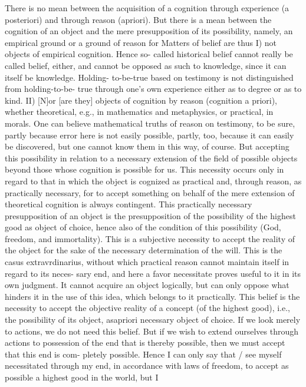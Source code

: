 There is no mean between the acquisition of a cognition through experience (a posteriori)
and through reason (apriori). But there is a mean between the cognition of an object and the
mere presupposition of its possibility, namely, an empirical ground or a ground of reason for
Matters of belief are thus I) not objects of empirical cognition. Hence so-
called historical belief cannot really be called belief, either, and cannot be
opposed as such to knowledge, since it can itself be knowledge. Holding-
to-be-true based on testimony is not distinguished from holding-to-be-
true through one's own experience either as to degree or as to kind.
II) [N]or [are they] objects of cognition by reason (cognition a priori),
whether theoretical, e.g., in mathematics and metaphysics, or practical, in
morals.
One can believe mathematical truths of reason on testimony, to be sure,
partly because error here is not easily possible, partly, too, because it can
easily be discovered, but one cannot know them in this way, of course. But
accepting this possibility in relation to a necessary extension of the field of possible objects
beyond those whose cognition is possible for us. This necessity occurs only in regard to that
in which the object is cognized as practical and, through reason, as practically necessary, for
to accept something on behalf of the mere extension of theoretical cognition is always
contingent. This practically necessary presupposition of an object is the presupposition of the
possibility of the highest good as object of choice, hence also of the condition of this
possibility (God, freedom, and immortality). This is a subjective necessity to accept the
reality of the object for the sake of the necessary determination of the will. This is the casus
extravrdinarius, without which practical reason cannot maintain itself in regard to its neces-
sary end, and here a favor necessitate proves useful to it in its own judgment. It cannot acquire
an object logically, but can only oppose what hinders it in the use of this idea, which belongs
to it practically.
This belief is the necessity to accept the objective reality of a concept (of the highest
good), i.e., the possibility of its object, asapriori necessary object of choice. If we look merely
to actions, we do not need this belief. But if we wish to extend ourselves through actions to
possession of the end that is thereby possible, then we must accept that this end is com-
pletely possible. Hence I can only say that / see myself necessitated through my end, in
accordance with laws of freedom, to accept as possible a highest good in the world, but I
